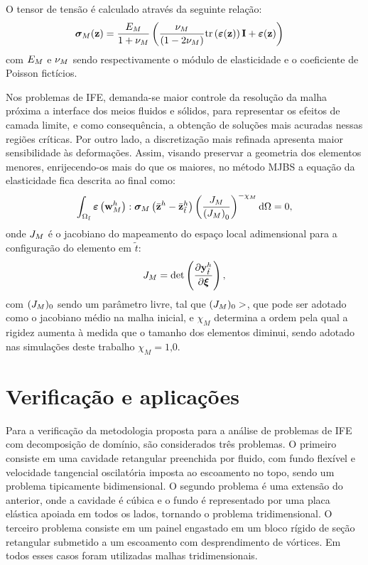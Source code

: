 O tensor de tensão é calculado através da seguinte relação:
\begin{align}
	\boldsymbol{\sigma}_{M}(\mathbf{z})
	&=
	\frac{E_{M}}{1+\nu_{M}}
	\left(
	\frac{\nu_{M}}{(1 - 2 \nu_{M})}
	\mathrm{tr}\left(\bm{\varepsilon}(\mathbf{z})\right)\mathbf{I}
	+
	\bm{\varepsilon}(\mathbf{z})
	\right)
\end{align}
\noindent com $E_{M}$ e $\nu_{M}$ 	sendo respectivamente o módulo de elasticidade e o coeficiente de Poisson fictícios. 

Nos problemas de IFE, demanda-se maior controle da resolução da malha próxima a interface dos meios fluidos e sólidos, para representar os efeitos de camada limite, e como consequência, a obtenção de soluções mais acuradas nessas regiões críticas. Por outro lado, a discretização mais refinada apresenta maior sensibilidade às deformações. Assim, visando preservar a geometria dos elementos menores, enrijecendo-os mais do que os maiores, no método MJBS a equação da elasticidade fica descrita ao final como:
\begin{align}
	\int_{\Omega_{\tilde{t}}} \bm{\varepsilon} \left(\mathbf{w}_{M}^h\right) : \boldsymbol{\sigma}_{M} \left(\bar{\mathbf{z}}^h- \bar{\mathbf{z}}_{\tilde{t}}^h\right) \left(\frac{J_{M}}{\left({J_{M}}\right)_0}\right)^{-\chi_M} \mathrm{d} \Omega = 0, 
	\label{eq:elasticityMJBS}
\end{align}
\noindent onde $J_{M}$ é o jacobiano do mapeamento do espaço local adimensional para a configuração do elemento em $\tilde{t}$:
\begin{align}
	J_{M} = \det\left(\frac{\partial\mathbf{y}^h_{\tilde{t}}}{\partial\boldsymbol{\xi}}\right),
\end{align}
\noindent com $(J_{M})_0$ sendo um parâmetro livre, tal que $(J_{M})_0>$, que pode ser adotado como o jacobiano médio na malha inicial, e $\chi_M$ determina a ordem pela qual a rigidez aumenta à medida que o tamanho dos elementos diminui, sendo adotado nas simulações deste trabalho $\chi_M=1\text{,}0$. 


\section{Verificação e aplicações}

Para a verificação da metodologia proposta para a análise de problemas de IFE com decomposição de domínio, são considerados três problemas. O primeiro consiste em uma cavidade retangular preenchida por fluido, com fundo flexível e velocidade tangencial oscilatória imposta ao escoamento no topo, sendo um problema tipicamente bidimensional. O segundo problema é uma extensão do anterior, onde a cavidade é cúbica e o fundo é representado por uma placa elástica apoiada em todos os lados, tornando o problema tridimensional. O terceiro problema consiste em um painel engastado em um bloco rígido de seção retangular submetido a um escoamento com desprendimento de vórtices. Em todos esses casos foram utilizadas malhas tridimensionais.

